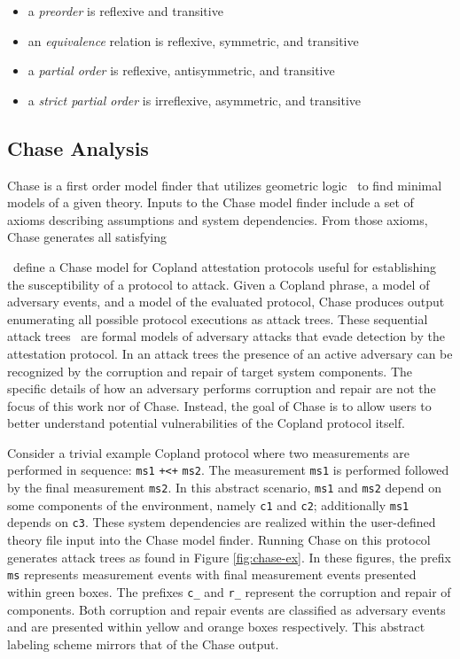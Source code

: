 \documentclass[runningheads]{llncs}
\theoremstyle{definition}
\newcommand{\squash}{\itemsep=0pt\parskip=0pt}
\begin{document}
\begin{itemize}
  \squash
\item a \emph{preorder} is reflexive and transitive
\item an \emph{equivalence} relation is reflexive, symmetric, and transitive 
\item a \emph{partial order} is reflexive, antisymmetric, and transitive 
\item a \emph{strict partial order} is irreflexive, asymmetric, and transitive 
\end{itemize}

\subsection*{Chase Analysis}

Chase \cite{Ramsdell:2020:Chase,Rowe:2021:AutomatedTrust} is a first
order model finder that utilizes geometric
logic~\citep{Enderton:logic} to find minimal models of a given
theory. Inputs to the Chase model finder include a set of axioms
describing assumptions and system dependencies. From those axioms,
Chase generates all satisfying


\citet{Rowe:2021:AutomatedTrust}~define a Chase model for Copland
attestation protocols useful for establishing the susceptibility of a
protocol to attack. Given a Copland phrase, a model of adversary
events, and a model of the evaluated protocol, Chase produces output
enumerating all possible protocol executions as attack trees. These
sequential attack trees~\citep{Horne:Attack, Jhaware:attack} are
formal models of adversary attacks that evade detection by the
attestation protocol.  In an attack trees the presence of an active
adversary can be recognized by the corruption and repair of target
system components. The specific details of how an adversary performs
corruption and repair are not the focus of this work nor of
Chase. Instead, the goal of Chase is to allow users to better
understand potential vulnerabilities of the Copland
protocol itself.

Consider a trivial example Copland protocol where two measurements are
performed in sequence: \texttt{ms1} \texttt{+<+} \texttt{ms2}.
The measurement \texttt{ms1} is performed followed by the
final measurement \texttt{ms2}. In this abstract scenario, \texttt{ms1} and
\texttt{ms2} depend on some components of the environment, namely
\texttt{c1} and \texttt{c2}; additionally \texttt{ms1} depends on
\texttt{c3}. These system dependencies are realized within the
user-defined theory file input into the Chase model finder. Running
Chase on this protocol generates attack trees as found in Figure
\ref{fig:chase-ex}. In these figures, the prefix \texttt{ms}
represents measurement events with final measurement events presented
within green boxes. The prefixes \texttt{c\_} and  \texttt{r\_} 
represent the corruption and repair of components. Both
corruption and repair events are classified as adversary events and
are presented within yellow and orange boxes respectively. This
abstract labeling scheme mirrors that of the Chase output.
\end{document}
